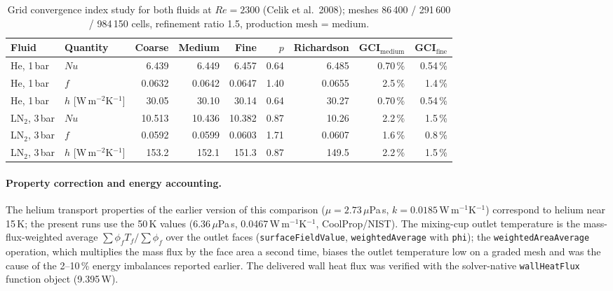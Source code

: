 \documentclass[11pt]{article}
\newcommand{\LNtwo}{LN$_2$}\renewcommand{\Re}{\mathit{Re}}\newcommand{\Nu}{\mathit{Nu}}
\begin{document}
\begin{table}[H]\centering\small
\caption{Grid convergence index study for both fluids at $\Re=2300$ (Celik et al.\ 2008); meshes 86\,400 /
291\,600 / 984\,150 cells, refinement ratio 1.5, production mesh = medium.}
\begin{tabular}{l l r r r r r r r}
\toprule
Fluid & Quantity & Coarse & Medium & Fine & $p$ & Richardson & GCI$_{\mathrm{medium}}$ & GCI$_{\mathrm{fine}}$ \\
\midrule
He, 1\,bar & $\Nu$ & 6.439 & 6.449 & 6.457 & 0.64 & 6.485 & 0.70\,\% & 0.54\,\% \\
He, 1\,bar & $f$ & 0.0632 & 0.0642 & 0.0647 & 1.40 & 0.0655 & 2.5\,\% & 1.4\,\% \\
He, 1\,bar & $h$ [W\,m$^{-2}$K$^{-1}$] & 30.05 & 30.10 & 30.14 & 0.64 & 30.27 & 0.70\,\% & 0.54\,\% \\
\LNtwo, 3\,bar & $\Nu$ & 10.513 & 10.436 & 10.382 & 0.87 & 10.26 & 2.2\,\% & 1.5\,\% \\
\LNtwo, 3\,bar & $f$ & 0.0592 & 0.0599 & 0.0603 & 1.71 & 0.0607 & 1.6\,\% & 0.8\,\% \\
\LNtwo, 3\,bar & $h$ [W\,m$^{-2}$K$^{-1}$] & 153.2 & 152.1 & 151.3 & 0.87 & 149.5 & 2.2\,\% & 1.5\,\% \\
\bottomrule
\end{tabular}\end{table}

\paragraph{Property correction and energy accounting.} The helium transport properties of the
earlier version of this comparison ($\mu=2.73\,\mu$Pa\,s, $k=0.0185$\,W\,m$^{-1}$K$^{-1}$)
correspond to helium near 15\,K; the present runs use the 50\,K values ($6.36\,\mu$Pa\,s,
0.0467\,W\,m$^{-1}$K$^{-1}$, CoolProp/NIST). The mixing-cup outlet temperature is the
mass-flux-weighted average $\sum\phi_fT_f/\sum\phi_f$ over the outlet faces
(\texttt{surfaceFieldValue}, \texttt{weightedAverage} with \texttt{phi}); the
\texttt{weightedAreaAverage} operation, which multiplies the mass flux by the face area a second
time, biases the outlet temperature low on a graded mesh and was the cause of the 2--10\,\% energy
imbalances reported earlier. The delivered wall heat flux was verified with the solver-native
\texttt{wallHeatFlux} function object (9.395\,W).
\end{document}
